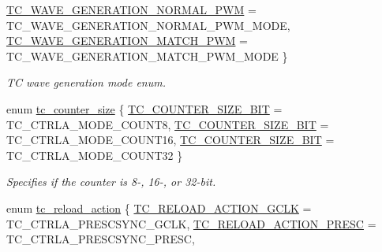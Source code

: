 \begin{DoxyCompactItemize}
\mbox{\hyperlink{group__asfdoc__sam0__tc__group_ggae7f1302b7e3d675e471a554668b49d64aad9dc196250ce8ca5a98c7e49cf0c1a9}{T\+C\+\_\+\+W\+A\+V\+E\+\_\+\+G\+E\+N\+E\+R\+A\+T\+I\+O\+N\+\_\+\+N\+O\+R\+M\+A\+L\+\_\+\+P\+WM}} = T\+C\+\_\+\+W\+A\+V\+E\+\_\+\+G\+E\+N\+E\+R\+A\+T\+I\+O\+N\+\_\+\+N\+O\+R\+M\+A\+L\+\_\+\+P\+W\+M\+\_\+\+M\+O\+DE, 
\mbox{\hyperlink{group__asfdoc__sam0__tc__group_ggae7f1302b7e3d675e471a554668b49d64a973273609713f828ce491f56fbf035d2}{T\+C\+\_\+\+W\+A\+V\+E\+\_\+\+G\+E\+N\+E\+R\+A\+T\+I\+O\+N\+\_\+\+M\+A\+T\+C\+H\+\_\+\+P\+WM}} = T\+C\+\_\+\+W\+A\+V\+E\+\_\+\+G\+E\+N\+E\+R\+A\+T\+I\+O\+N\+\_\+\+M\+A\+T\+C\+H\+\_\+\+P\+W\+M\+\_\+\+M\+O\+DE
 \}
\begin{DoxyCompactList}\small\item\em TC wave generation mode enum. \end{DoxyCompactList}\item 
enum \mbox{\hyperlink{group__asfdoc__sam0__tc__group_ga1b112627b81227c49c16b1a93e3321a0}{tc\+\_\+counter\+\_\+size}} \{ \mbox{\hyperlink{group__asfdoc__sam0__tc__group_gga1b112627b81227c49c16b1a93e3321a0abf2e8000eeeac2a4f259ba117d1ee934}{T\+C\+\_\+\+C\+O\+U\+N\+T\+E\+R\+\_\+\+S\+I\+Z\+E\+\_\+B\+IT}} = T\+C\+\_\+\+C\+T\+R\+L\+A\+\_\+\+M\+O\+D\+E\+\_\+\+C\+O\+U\+N\+T8, 
\mbox{\hyperlink{group__asfdoc__sam0__tc__group_gga1b112627b81227c49c16b1a93e3321a0a07c9fe9d2a5e78a9c1be46ce540adad1}{T\+C\+\_\+\+C\+O\+U\+N\+T\+E\+R\+\_\+\+S\+I\+Z\+E\+\_\+B\+IT}} = T\+C\+\_\+\+C\+T\+R\+L\+A\+\_\+\+M\+O\+D\+E\+\_\+\+C\+O\+U\+N\+T16, 
\mbox{\hyperlink{group__asfdoc__sam0__tc__group_gga1b112627b81227c49c16b1a93e3321a0a7d28e63b11a550605d003c894fe134c5}{T\+C\+\_\+\+C\+O\+U\+N\+T\+E\+R\+\_\+\+S\+I\+Z\+E\+\_\+B\+IT}} = T\+C\+\_\+\+C\+T\+R\+L\+A\+\_\+\+M\+O\+D\+E\+\_\+\+C\+O\+U\+N\+T32
 \}
\begin{DoxyCompactList}\small\item\em Specifies if the counter is 8-\/, 16-\/, or 32-\/bit. \end{DoxyCompactList}\item 
enum \mbox{\hyperlink{group__asfdoc__sam0__tc__group_ga204bb4814c91e62e56d9297c05280aad}{tc\+\_\+reload\+\_\+action}} \{ \mbox{\hyperlink{group__asfdoc__sam0__tc__group_gga204bb4814c91e62e56d9297c05280aadaea50b7d7b79cfbd72298720e0f6d51ed}{T\+C\+\_\+\+R\+E\+L\+O\+A\+D\+\_\+\+A\+C\+T\+I\+O\+N\+\_\+\+G\+C\+LK}} = T\+C\+\_\+\+C\+T\+R\+L\+A\+\_\+\+P\+R\+E\+S\+C\+S\+Y\+N\+C\+\_\+\+G\+C\+LK, 
\mbox{\hyperlink{group__asfdoc__sam0__tc__group_gga204bb4814c91e62e56d9297c05280aada97857fba0947beb9110ab79d2990e559}{T\+C\+\_\+\+R\+E\+L\+O\+A\+D\+\_\+\+A\+C\+T\+I\+O\+N\+\_\+\+P\+R\+E\+SC}} = T\+C\+\_\+\+C\+T\+R\+L\+A\+\_\+\+P\+R\+E\+S\+C\+S\+Y\+N\+C\+\_\+\+P\+R\+E\+SC, 

\end{DoxyCompactItemize}
